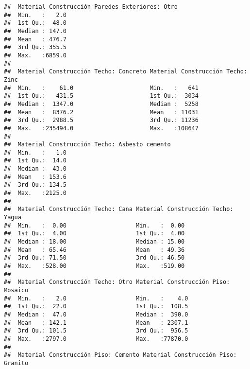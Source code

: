 \documentclass[11pt,]{article}
\begin{document}
\begin{verbatim}
##  Material Construcción Paredes Exteriores: Otro
##  Min.   :   2.0                                
##  1st Qu.:  48.0                                
##  Median : 147.0                                
##  Mean   : 476.7                                
##  3rd Qu.: 355.5                                
##  Max.   :6859.0                                
##                                                
##  Material Construcción Techo: Concreto Material Construcción Techo: Zinc
##  Min.   :    61.0                      Min.   :   641                   
##  1st Qu.:   431.5                      1st Qu.:  3034                   
##  Median :  1347.0                      Median :  5258                   
##  Mean   :  8376.2                      Mean   : 11031                   
##  3rd Qu.:  2988.5                      3rd Qu.: 11236                   
##  Max.   :235494.0                      Max.   :108647                   
##                                                                         
##  Material Construcción Techo: Asbesto cemento
##  Min.   :   1.0                              
##  1st Qu.:  14.0                              
##  Median :  43.0                              
##  Mean   : 153.6                              
##  3rd Qu.: 134.5                              
##  Max.   :2125.0                              
##                                              
##  Material Construcción Techo: Cana Material Construcción Techo: Yagua
##  Min.   :  0.00                    Min.   :  0.00                    
##  1st Qu.:  4.00                    1st Qu.:  4.00                    
##  Median : 18.00                    Median : 15.00                    
##  Mean   : 65.46                    Mean   : 49.36                    
##  3rd Qu.: 71.50                    3rd Qu.: 46.50                    
##  Max.   :528.00                    Max.   :519.00                    
##                                                                      
##  Material Construcción Techo: Otro Material Construcción Piso: Mosaico
##  Min.   :   2.0                    Min.   :    4.0                    
##  1st Qu.:  22.0                    1st Qu.:  108.5                    
##  Median :  47.0                    Median :  390.0                    
##  Mean   : 142.1                    Mean   : 2307.1                    
##  3rd Qu.: 101.5                    3rd Qu.:  956.5                    
##  Max.   :2797.0                    Max.   :77870.0                    
##                                                                       
##  Material Construcción Piso: Cemento Material Construcción Piso: Granito

\end{verbatim}
\end{document}
